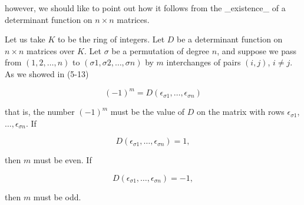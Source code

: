 however, we should like to point out how it follows from the _existence_ of a determinant function on \(n\times n\) matrices.

Let us take \(K\) to be the ring of integers. Let \(D\) be a determinant function on \(n\times n\) matrices over \(K\). Let \(\sigma\) be a permutation of degree \(n\), and suppose we pass from \((1,2,\ldots,n)\) to \((\sigma 1,\sigma 2,\ldots,\sigma n)\) by \(m\) interchanges of pairs \((i,j)\), \(i\neq j\). As we showed in (5-13)

\[(-1)^{m}=D(\epsilon_{\sigma 1},\ldots,\epsilon_{\sigma n})\]

that is, the number \((-1)^{m}\) must be the value of \(D\) on the matrix with rows \(\epsilon_{\sigma 1}\), \(\ldots,\epsilon_{\sigma n}\). If

\[D(\epsilon_{\sigma 1},\ldots,\epsilon_{\sigma n})=1,\]

then \(m\) must be even. If

\[D(\epsilon_{\sigma 1},\ldots,\epsilon_{\sigma n})=-1,\]

then \(m\) must be odd.

 